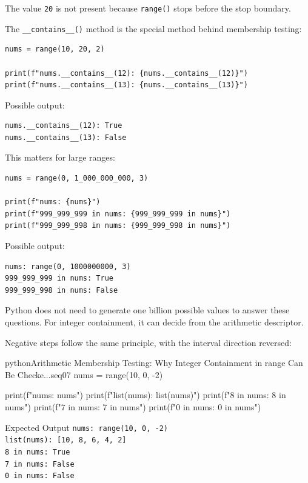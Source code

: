 The value \texttt{20} is not present because \texttt{range()} stops before the stop boundary.

The \texttt{\_\_contains\_\_()} method is the special method behind membership testing:

\begin{verbatim}
nums = range(10, 20, 2)

print(f"nums.__contains__(12): {nums.__contains__(12)}")
print(f"nums.__contains__(13): {nums.__contains__(13)}")
\end{verbatim}

Possible output:

\begin{verbatim}
nums.__contains__(12): True
nums.__contains__(13): False
\end{verbatim}

This matters for large ranges:

\begin{verbatim}
nums = range(0, 1_000_000_000, 3)

print(f"nums: {nums}")
print(f"999_999_999 in nums: {999_999_999 in nums}")
print(f"999_999_998 in nums: {999_999_998 in nums}")
\end{verbatim}

Possible output:

\begin{verbatim}
nums: range(0, 1000000000, 3)
999_999_999 in nums: True
999_999_998 in nums: False
\end{verbatim}

Python does not need to generate one billion possible values to answer these questions. For integer containment, it can decide from the arithmetic descriptor.

Negative steps follow the same principle, with the interval direction reversed:

\begin{codebox}[]{python}{Arithmetic Membership Testing: Why Integer Containment in range Can Be Checke...}{seq07}
nums = range(10, 0, -2)

print(f"nums: {nums}")
print(f"list(nums): {list(nums)}")
print(f"8 in nums: {8 in nums}")
print(f"7 in nums: {7 in nums}")
print(f"0 in nums: {0 in nums}")
\end{codebox}


\begin{iobox}{Expected Output}
\texttt{nums: range(10, 0, -2)} \\
\texttt{list(nums): [10, 8, 6, 4, 2]} \\
\texttt{8 in nums: True} \\
\texttt{7 in nums: False} \\
\texttt{0 in nums: False} \\
\end{iobox}


